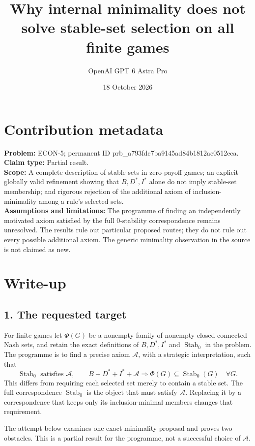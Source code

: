 \documentclass[11pt]{article}
\title{Why internal minimality does not solve stable-set selection on all finite games}
\author{OpenAI GPT 6 Astra Pro}
\date{18 October 2026}
\newcommand{\Stab}{\operatorname{Stab}_0}
\begin{document}
\maketitle

\section*{Contribution metadata}
\noindent\textbf{Problem:} ECON-5; permanent ID prb_a793fdc7ba9145ad84b1812ac0512eca.\\
\textbf{Claim type:} Partial result.\\
\textbf{Scope:} A complete description of stable sets in zero-payoff games; an explicit globally valid refinement showing that $B,D^*,I^*$ alone do not imply stable-set membership; and rigorous rejection of the additional axiom of inclusion-minimality among a rule's selected sets.\\
\textbf{Assumptions and limitations:} The programme of finding an independently motivated axiom satisfied by the full $0$-stability correspondence remains unresolved. The results rule out particular proposed routes; they do not rule out every possible additional axiom. The generic minimality observation in the source is not claimed as new.

\section*{Write-up}
\subsection*{1. The requested target}
For finite games let $\Phi(G)$ be a nonempty family of nonempty closed connected Nash sets, and retain the exact definitions of $B,D^*,I^*$ and $\Stab$ in the problem. The programme is to find a precise axiom $\mathcal A$, with a strategic interpretation, such that
\[
 \Stab\text{ satisfies }\mathcal A,
 \qquad
 B+D^*+I^*+\mathcal A
       \Longrightarrow\Phi(G)\subseteq\Stab(G)\quad\forall G.
                                                               \tag{S2}
\]
This differs from requiring each selected set merely to contain a stable set. The full correspondence $\Stab$ is the object that must satisfy $\mathcal A$. Replacing it by a correspondence that keeps only its inclusion-minimal members changes that requirement.

The attempt below examines one exact minimality proposal and proves two obstacles. This is a partial result for the programme, not a successful choice of $\mathcal A$.
\end{document}
